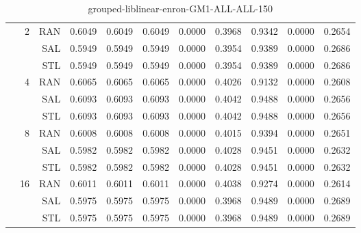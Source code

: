 \begin{center}
\begin{table}[htbp]
\begin{center}
\begin{tabular}{ | r | r | r | r | r | r | r | r | r | r | r |}
 & \multirow{3}{*}{2} & RAN & 0.6049 & 0.6049 & 0.6049 & 0.0000 & 0.3968 & 0.9342 & 0.0000 & 0.2654\\ \cline{3-11}
 &   & SAL & 0.5949 & 0.5949 & 0.5949 & 0.0000 & 0.3954 & 0.9389 & 0.0000 & 0.2686\\ \cline{3-11}
 &   & STL & 0.5949 & 0.5949 & 0.5949 & 0.0000 & 0.3954 & 0.9389 & 0.0000 & 0.2686\\ \cline{2-11}
 & \multirow{3}{*}{4} & RAN & 0.6065 & 0.6065 & 0.6065 & 0.0000 & 0.4026 & 0.9132 & 0.0000 & 0.2608\\ \cline{3-11}
 &   & SAL & 0.6093 & 0.6093 & 0.6093 & 0.0000 & 0.4042 & 0.9488 & 0.0000 & 0.2656\\ \cline{3-11}
 &   & STL & 0.6093 & 0.6093 & 0.6093 & 0.0000 & 0.4042 & 0.9488 & 0.0000 & 0.2656\\ \cline{2-11}
 & \multirow{3}{*}{8} & RAN & 0.6008 & 0.6008 & 0.6008 & 0.0000 & 0.4015 & 0.9394 & 0.0000 & 0.2651\\ \cline{3-11}
 &   & SAL & 0.5982 & 0.5982 & 0.5982 & 0.0000 & 0.4028 & 0.9451 & 0.0000 & 0.2632\\ \cline{3-11}
 &   & STL & 0.5982 & 0.5982 & 0.5982 & 0.0000 & 0.4028 & 0.9451 & 0.0000 & 0.2632\\ \cline{2-11}
 & \multirow{3}{*}{16} & RAN & 0.6011 & 0.6011 & 0.6011 & 0.0000 & 0.4038 & 0.9274 & 0.0000 & 0.2614\\ \cline{3-11}
 &   & SAL & 0.5975 & 0.5975 & 0.5975 & 0.0000 & 0.3968 & 0.9489 & 0.0000 & 0.2689\\ \cline{3-11}
 &   & STL & 0.5975 & 0.5975 & 0.5975 & 0.0000 & 0.3968 & 0.9489 & 0.0000 & 0.2689\\ \cline{2-11}
\hline
\end{tabular}
\caption{grouped-liblinear-enron-GM1-ALL-ALL-150}
\end{center}
 \end{table}
\end{center}

